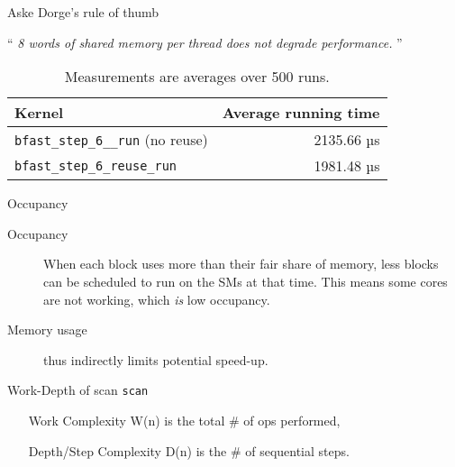 \begin{frame}[fragile]{Aske Dorge's rule of thumb}

\enquote{
    \textit{
       8 words of shared memory per thread does not degrade performance. 
    }
}
    \begin{table}
        \centering
        \begin{tabular}{l r}
            \textbf{Kernel} & \textbf{Average running time} \\ \hline
            \texttt{bfast\_step\_6\_\_run} (no reuse) &     2135.66 µs \\
            \texttt{bfast\_step\_6\_reuse\_run} & 1981.48 µs
        \end{tabular}
        \caption{Measurements are averages over 500 runs.}
       \label{tab:noreuse}
    \end{table}

\end{frame}



\begin{frame}[fragile]{Occupancy}

    \begin{description}
        \item [Occupancy] When each block uses more than their fair share of
            memory, less blocks can be scheduled to run on the SMs at that time.
            This means some cores are not working, which \textit{is} low occupancy.
        \item [Memory usage] thus indirectly limits potential speed-up.
    \end{description}

\end{frame}



\begin{frame}[fragile]{Work-Depth of scan \texttt{scan}}

    \begin{enumerate}
        \item [Work Complexity W(n)] is the total \# of ops performed,
        \item [Depth/Step Complexity D(n)] is the \# of sequential steps.
    \end{enumerate}

\end{frame}
